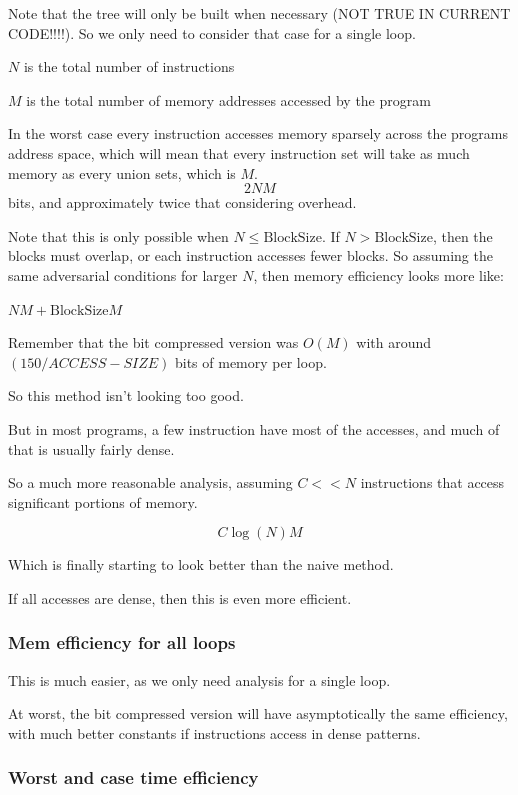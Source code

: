 \documentclass[12pt,twoside]{reedthesis}
\begin{document}
		Note that the tree will only be built when necessary (NOT TRUE IN CURRENT CODE!!!!). So we only need to consider that case for a single loop.
		
		$N$ is the total number of instructions
		
		$M$ is the total number of memory addresses accessed by the program
		
		In the worst case every instruction accesses memory sparsely across the programs address space, which will mean that every instruction set will take as much memory as every union sets, which is $M$. 
		$$2N M$$ 
		bits, and approximately twice that considering overhead. 
		
		Note that this is only possible when $N \le \text{BlockSize}$. If $N > \text{BlockSize}$, then the blocks must overlap, or each instruction accesses fewer blocks. So assuming the same adversarial conditions for larger $N$, then memory efficiency looks more like:
		
		$NM + \text{BlockSize}M$
		
		Remember that the bit compressed version was $O(M)$ with around $(150/ACCESS-SIZE)$ bits of memory per loop.
		
		So this method isn't looking too good. 
		
		But in most programs, a few instruction have most of the accesses, and much of that is usually fairly dense. 
		
		So a much more reasonable analysis, assuming $C << N$ instructions that access significant portions of memory.
		
		$$C\log(N)M$$ 
		
		Which is finally starting to look better than the naive method. 
		
		If all accesses are dense, then this is even more efficient.
		
		\subsubsection{Mem efficiency for all loops}
		
		This is much easier, as we only need analysis for a single loop. 
		
		At worst, the bit compressed version will have asymptotically the same efficiency, with much better constants if instructions access in dense patterns. 
		
		\subsubsection{Worst and case time efficiency}
		
\end{document}

